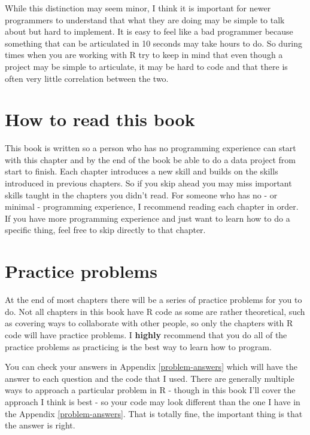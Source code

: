 \documentclass[
]{krantz}
\begin{document}
While this distinction may seem minor, I think it is important for newer programmers to understand that what they are doing may be simple to talk about but hard to implement. It is easy to feel like a bad programmer because something that can be articulated in 10 seconds may take hours to do. So during times when you are working with R try to keep in mind that even though a project may be simple to articulate, it may be hard to code and that there is often very little correlation between the two.

\hypertarget{how-to-read-this-book}{%
\section{How to read this book}\label{how-to-read-this-book}}

This book is written so a person who has no programming experience can start with this chapter and by the end of the book be able to do a data project from start to finish. Each chapter introduces a new skill and builds on the skills introduced in previous chapters. So if you skip ahead you may miss important skills taught in the chapters you didn't read. For someone who has no - or minimal - programming experience, I recommend reading each chapter in order. If you have more programming experience and just want to learn how to do a specific thing, feel free to skip directly to that chapter.

\hypertarget{practice-problems}{%
\section{Practice problems}\label{practice-problems}}

At the end of most chapters there will be a series of practice problems for you to do. Not all chapters in this book have R code as some are rather theoretical, such as covering ways to collaborate with other people, so only the chapters with R code will have practice problems. I \textbf{highly} recommend that you do all of the practice problems as practicing is the best way to learn how to program.

You can check your answers in Appendix \ref{problem-answers} which will have the answer to each question and the code that I used. There are generally multiple ways to approach a particular problem in R - though in this book I'll cover the approach I think is best - so your code may look different than the one I have in the Appendix \ref{problem-answers}. That is totally fine, the important thing is that the answer is right.
\end{document}
